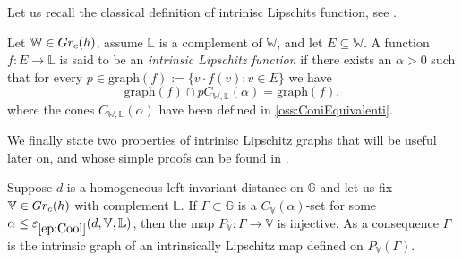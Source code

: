 \documentclass[10pt, a4paper,
oneside, headinclude,footinclude]{scrartcl}
\begin{document}

Let us recall the classical definition of intrinisc Lipschits function, see \cite[Definition 11]{FranchiSerapioni16}. %

\begin{definizione}\label{def:iLipfunctions}
Let $\mathbb{W}\in Gr_c(h)$, assume $\mathbb{L}$ is a complement of $\mathbb{W}$, and let $E\subseteq \mathbb{W}$. A function $f:E\to \mathbb{L}$ is said to be an \emph{intrinsic Lipschitz function} if there exists an $\alpha>0$ such that for every $p\in\text{graph}(f):=\{v\cdot f(v):v\in E\}$ we have 
$$
\text{graph}(f)\cap pC_{\mathbb W,\mathbb L}(\alpha)=\text{graph}(f),
$$
where the cones $C_{\mathbb W,\mathbb L}(\alpha)$ have been defined in \cref{oss:ConiEquivalenti}.
\end{definizione}

We finally state two properties of intrinisc Lipschitz graphs that will be useful later on, and whose simple proofs can be found in \cite{antonelli2020rectifiable}.
\begin{proposizione}\label{prop:ConeAndGraph}
Suppose $d$ is a homogeneous left-invariant distance on $\mathbb{G}$ and let us fix $\mathbb V\in Gr_c(h)$ with complement $\mathbb L$. If $\Gamma\subset\mathbb G$ is a $C_{\mathbb V}(\alpha)$-set for some $\alpha\leq \oldep{ep:Cool}(d,\mathbb V,\mathbb L)$, then the map $P_{\mathbb V}:\Gamma\to\mathbb V$ is injective. As a consequence $\Gamma$ is the intrinsic graph of an intrinsically Lipschitz map defined on $P_{\mathbb V}(\Gamma)$.
\end{proposizione}
\end{document}
